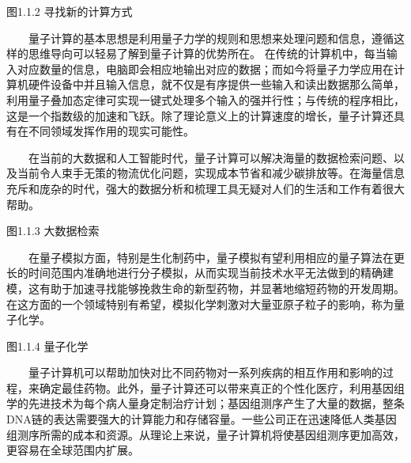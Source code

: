 \documentclass[a4paper,11pt,english]{sphinxmanual}
\begin{document}

\begin{center}图1.1.2 寻找新的计算方式
\end{center}
\sphinxAtStartPar
  量子计算的基本思想是利用量子力学的规则和思想来处理问题和信息，遵循这样的思维导向可以轻易了解到量子计算的优势所在。
在传统的计算机中，每当输入对应数量的信息，电脑即会相应地输出对应的数据；而如今将量子力学应用在计算机硬件设备中并且输入信息，就不仅是有序提供一些输入和读出数据那么简单，利用量子叠加态定律可实现一键式处理多个输入的强并行性；与传统的程序相比，这是一个指数级的加速和飞跃。除了理论意义上的计算速度的增长，量子计算还具有在不同领域发挥作用的现实可能性。

\sphinxAtStartPar
{}

\sphinxAtStartPar
  在当前的大数据和人工智能时代，量子计算可以解决海量的数据检索问题、以及当前令人束手无策的物流优化问题，实现成本节省和减少碳排放等。在海量信息充斥和庞杂的时代，强大的数据分析和梳理工具无疑对人们的生活和工作有着很大帮助。


\begin{center}图1.1.3 大数据检索
\end{center}
\sphinxAtStartPar
{}

\sphinxAtStartPar
  在量子模拟方面，特别是生化制药中，量子模拟有望利用相应的量子算法在更长的时间范围内准确地进行分子模拟，从而实现当前技术水平无法做到的精确建模，这有助于加速寻找能够挽救生命的新型药物，并显著地缩短药物的开发周期。在这方面的一个领域特别有希望，模拟化学刺激对大量亚原子粒子的影响，称为量子化学。


\begin{center}图1.1.4 量子化学
\end{center}
\sphinxAtStartPar
  量子计算机可以帮助加快对比不同药物对一系列疾病的相互作用和影响的过程，来确定最佳药物。此外，量子计算还可以带来真正的个性化医疗，利用基因组学的先进技术为每个病人量身定制治疗计划；基因组测序产生了大量的数据，整条DNA链的表达需要强大的计算能力和存储容量。一些公司正在迅速降低人类基因组测序所需的成本和资源。从理论上来说，量子计算机将使基因组测序更加高效，更容易在全球范围内扩展。
\end{document}
